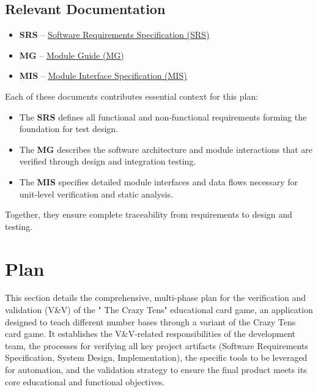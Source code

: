 \documentclass[12pt, titlepage]{article}
\begin{document}
\subsection{Relevant Documentation}
\begin{itemize}
    \item \textbf{SRS} – \href{https://github.com/The-Crazy-Four-Games/Crazy-Eights-Game/blob/main/docs/SRS-Volere/SRS.pdf}{Software Requirements Specification (SRS)}  
    \item \textbf{MG} – \href{https://github.com/The-Crazy-Four-Games/Crazy-Eights-Game/blob/main/docs/Design/SoftArchitecture/MG.pdf}{Module Guide (MG)}  
    \item \textbf{MIS} – \href{https://github.com/The-Crazy-Four-Games/Crazy-Eights-Game/blob/main/docs/Design/SoftDetailedDes/MIS.pdf}{Module Interface Specification (MIS)}  
\end{itemize}

Each of these documents contributes essential context for this plan:
\begin{itemize}
    \item The \textbf{SRS} defines all functional and non-functional requirements forming the foundation for test design.  
    \item The \textbf{MG} describes the software architecture and module interactions that are verified through design and integration testing.  
    \item The \textbf{MIS} specifies detailed module interfaces and data flows necessary for unit-level verification and static analysis.  
\end{itemize}
Together, they ensure complete traceability from requirements to design and testing.


\section{Plan}
This section details the comprehensive, multi-phase plan for the verification and validation (V\&V) of the " The Crazy Tens" educational card game, an application designed to teach different number bases through a variant of the Crazy Tens card game. It establishes the V\&V-related responsibilities of the development team, the processes for verifying all key project artifacts (Software Requirements Specification, System Design, Implementation), the specific tools to be leveraged for automation, and the validation strategy to ensure the final product meets its core educational and functional objectives.   
\end{document}
